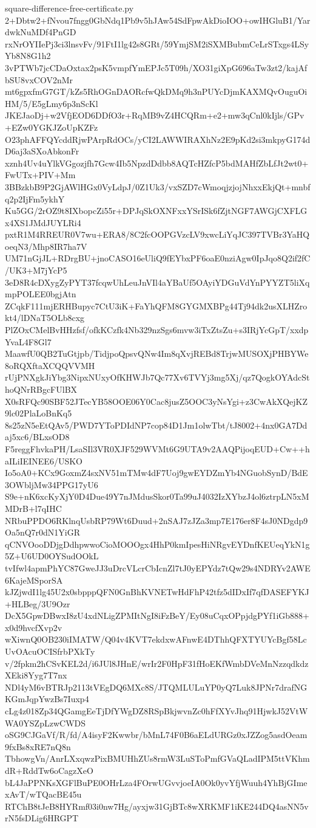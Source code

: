 \documentclass[11pt]{article}
\theoremstyle{definition}
\theoremstyle{remark}
\begin{document}
\begin{filecontents*}[overwrite]{square-difference-free-certificate.py}
2+Dbtw2+fNvou7fngg0GbNdq1Pb9v5hJAw54SdFpwAkDioIOO+owIHGluB1/YardwkNuMDf4PnGD
rxNrOYIIePj3ci3lnsvFv/91FtI1lg42s8GRt/59YmjSM2iSXMBubmCeLrSTxgs4LSyYb8N8G1h2
3vPTWb7jcCDaOxtax2psK5vmpfYmEPJc5T09h/XO31giXpG696aTw3zt2/kajAfbSU8vxCOV2nMr
mt6gpxfmG7GT/kZs5RhOGnDAORcfwQkDMq9h3nPUYcDjmKAXMQvOuguOiHM/5/E5gLmy6p3nScKl
JKEJaoDj+w2VfjEOD6DDfO3r+RqMB9vZ4HCQRm+e2+mw3qCnl0kIjls/GPv+EZw0YGKJZoUpKZFz
O23phAFFQYcddRjwPArpRdOCs/yCI2LAWWIRAXhNz2E9pKd2si3mkpyG174dD6aj3aSXoAbkonFr
xznh4Uv4uYlkVGgozjfh7Gcw4Ib5NpzdDdbb8AQTcHZfcP5bdMAHfZbLfJt2wt0+FwUTx+PIV+Mm
3BBzkbB9P2GjAWlHGx0VyLdpJ/0Z1Uk3/vxSZD7cWmoqjzjojNhxxEkjQt+mnbfq2p2IjFm5ykhY
Ku5GG/2rOZ9t8IXbopcZi55r+DPJqSkOXNFxxYSrISk6fZjtNGF7AWGjCXFLGx4XS1JMdJUYLRi4
pxtR1M4RREUR0V7wu+ERA8/8C2fcOOPGVzcLV9xwcLiYqJC397TVBr3YaHQoeqN3/Mhp8IR7ha7V
UM71nGjJL+RDrgBU+jnoCASO16eUliQ9fEYbxPF6oaE0nziAgw0IpJqo8Q2if2fC/UK3+M7jYcP5
3eD8R4cDXygZyPYT37fcqwUhLeuJnVIl4aYBaUf5OAyiYDGuVdYnPYYZT5liXqmpPOLEE0bgjAtn
ZCqkF111mjERHBupyc7CtU3iK+FaYhQFM8GYGMXBPg44Tj94dk2usXLHZrokt4/lDNaT5OLb8cxg
PlZOxCMelBvHHzfsf/ofkKCzfk4Nb329nzSgs6mvw3iTxZtsZu+s3IRjYcGpT/xxdpYvaL4F8Gl7
MaawfU0QB2TuGtjpb/TidjpoQpsvQNw4Im8qXvjREBd8TrjwMUSOXjPHBYWe8oRQXftaXCQQVVMH
rUjPNXgkJiYbg3NipxNUxyOfKHWJb7Qc77Xv6TVYj3mg5Xj/qz7QogkOYAdcSthoQNrRBgcFUlBX
X0sRFQc90SBF52JTecYB58OOE06Y0Cac8jusZ5OOC3yNsYgi+z3CwAkXQejKZ9lc02PlaLoBnKq5
8s25zN5eEtQAv5/PWD7YToPDIdNP7cop84D1Jm1olwTbt/tJ8002+4nx0GA7Ddaj5xc6/BLxsOD8
F5reggFhvkaPH/LsaSIl3VR0XJF529WVMt6G9UTA9v2AAQPijoqEUD+Cw++haILiIEINEE6/USKO
Io5oA0+KCx9GoxmZ4sxNV51mTMw4dF7Uoj9gwEYDZmYb4NGuobSynD/BdE3OWbljMw34PPG17yU6
S9e+nK6xcKyXjY0D4Due49Y7nJMdusSkor0Ta99uJ4032IzXYbzJ4ol6ztrpLN5xMMDrB+l7qIHC
NRbuPPDO6RKlnqUsbRP79Wt6Duud+2nSAJ7zJZa3mp7E176er8F4sJ0NDgdp9Oa5nQ7r0dN1YiGR
qCNVOooDDjgDdhpwwoCioMOOOgx4HhP0kmIpesHiNRgvEYDnfKEUeqYkN1g5Z+U6UD0OYSudOOkL
tvIfwl4apmPhYC87GweJJ3uDrcVLcrCbIcnZl7tJ0yEPYdz7tQw29s4NDRYv2AWE6KajeMSporSA
kJZjwdI1lg45U2x0sbpppQFN0GnBhKVNETwHdFhP42tfz5dIDxIf7qfDASEFYKJ+HLBeg/3U9Ozr
DcX5GpwDBwxI8zU4xdNLigZPMItNgI8iFzBeY/Ey08uCqxOPpjdgPYf1iGb888+x0d9hvcfXvp2v
wXiwnQ0OB230iIMATW/Q04v4KVT7ekdxwAFnwE4DThhQFXTYUYcBgf58LcUvOAcuOCISfrbPXkTy
v/2fpkm2hCSvKEL2d/i6JUl8JHnE/wrIr2F0HpF31fHoEKfWmbDVeMnNzzqdkdzXEki8Yyg7T7nx
NDl4yM6vBTRJp2113tVEgDQ6MXc8S/JTQMLULuYP0yQ7Luk8JPNr7drafNGKGmJqpYwzBs7Iuxp4
cLg4z018Zp34QGamgEeTjDfYWgDZ8RSpBkjwvnZc0hFfXYvJhq91HjwkJ52VtWWA0YSZpLzwCWDS
oSG9CJGaVf/R/fd/A4isyF2Kwwbr/bMnL74F0B6aELdURGz0xJZZog5asdOeam9fxBs8xRE7nQ8n
TbhowgVn/AnrLXxqwzPixBMUHhZUs8rmW3LuSToPmfGVaQLadIPM5ttVKhmdR+RddTw6oCagzXeO
bL4JaPPNKsXGFlBuPE0OHrLza4FOrwUGvvjoeIA0Ok0yvYfjWuuh4YhBjGImexAvT/wTQacBE45u
RTChB8tJeB8HYRmf03i0nw7Hg/ayxjw31GjBTc8wXRKMF1iKE244DQ4asNN5vrN5fsDLig6HRGPT

\end{filecontents*}
\end{document}
